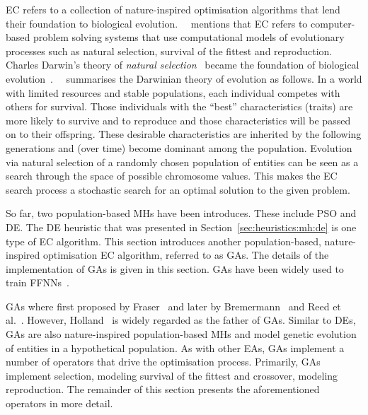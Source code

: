 \Ac{EC} refers to a collection of nature-inspired optimisation algorithms that lend their foundation to biological evolution.~\citeauthor{ref:engelbrecht:2007}~\cite{ref:engelbrecht:2007} mentions that \acs{EC} refers to computer-based problem solving systems that use computational models of evolutionary processes such as natural selection, survival of the fittest and reproduction. Charles Darwin's theory of \textit{natural selection}~\cite{ref:darwin:2012} became the foundation of biological evolution~\cite{ref:darwin:1987}.~\citeauthor{ref:engelbrecht:2007}~\cite{ref:engelbrecht:2007} summarises the Darwinian theory of evolution as follows. In a world with limited resources and stable populations, each individual competes with others for survival. Those individuals with the ``best'' characteristics (traits) are more likely to survive and to reproduce and those characteristics will be passed on to their offspring. These desirable characteristics are inherited by the following generations and (over time) become dominant among the population. Evolution via natural selection of a randomly chosen population of entities can be seen as a search through the space of possible chromosome values. This makes the \acs{EC} search process a stochastic search for an optimal solution to the given problem.

So far, two population-based \acp{MH} have been introduces. These include \acs{PSO} and \acs{DE}. The \acs{DE} heuristic that was presented in Section~\ref{sec:heuristics:mh:de} is one type of \acs{EC} algorithm. This section introduces another population-based, nature-inspired optimisation \acs{EC} algorithm, referred to as \acfp{GA}. The details of the implementation of \acp{GA} is given in this section. \acp{GA} have been widely used to train \acp{FFNN}~\cite{ref:montana:1989, ref:siddique:2001, ref:miller:1989}.

\Acp{GA} where first proposed by Fraser~\cite{ref:fraser:1957} and later by Bremermann~\cite{ref:bremermann:1962} and Reed et al.~\cite{ref:reed:1967}. However, Holland~\cite{ref:holland:1992} is widely regarded as the father of \acp{GA}. Similar to \acp{DE}, \acp{GA} are also nature-inspired population-based \acp{MH} and model genetic evolution of entities in a hypothetical population. As with other \acp{EA}, \acp{GA} implement a number of operators that drive the optimisation process.  Primarily, \acp{GA} implement selection, modeling survival of the fittest and crossover, modeling reproduction. The remainder of this section presents the aforementioned operators in more detail.

